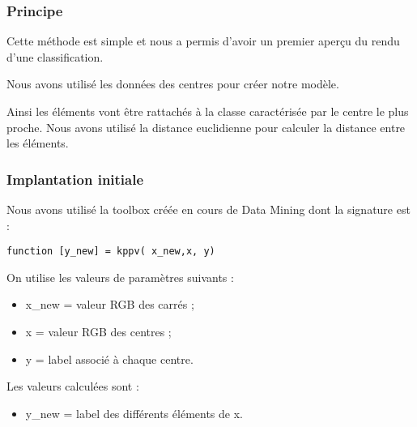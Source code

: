   \subsubsection{Principe}

  Cette méthode est simple et nous a permis d'avoir un premier aperçu du rendu d'une classification. 

  Nous avons utilisé les données des centres pour créer notre modèle. 

  Ainsi les éléments vont être rattachés à la classe caractérisée par le centre le plus proche. 
Nous avons utilisé la distance euclidienne pour calculer la distance entre les éléments. 

  \subsubsection{Implantation initiale}

  Nous avons utilisé la toolbox créée en cours de Data Mining dont la signature est : 

  \verb|function [y_new] = kppv( x_new,x, y)|

  On utilise les valeurs de paramètres suivants : 
  \begin{itemize}
    \item x\_new = valeur RGB des carrés ;
    \item x = valeur RGB des centres ;
    \item y = label associé à chaque centre. 
  \end{itemize}

Les valeurs calculées sont : 
  \begin{itemize}
    \item y\_new = label des différents éléments de x. 
  \end{itemize}
